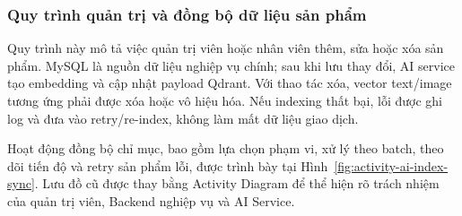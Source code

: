 






\subsubsection{Quy trình quản trị và đồng bộ dữ liệu sản phẩm}
Quy trình này mô tả việc quản trị viên hoặc nhân viên thêm, sửa hoặc xóa sản phẩm. MySQL là nguồn dữ liệu nghiệp vụ chính; sau khi lưu thay đổi, AI service tạo embedding và cập nhật payload Qdrant. Với thao tác xóa, vector text/image tương ứng phải được xóa hoặc vô hiệu hóa. Nếu indexing thất bại, lỗi được ghi log và đưa vào retry/re-index, không làm mất dữ liệu giao dịch.

Hoạt động đồng bộ chỉ mục, bao gồm lựa chọn phạm vi, xử lý theo batch, theo dõi tiến độ và retry sản phẩm lỗi, được trình bày tại Hình~\ref{fig:activity-ai-index-sync}. Lưu đồ cũ được thay bằng Activity Diagram để thể hiện rõ trách nhiệm của quản trị viên, Backend nghiệp vụ và AI Service.

